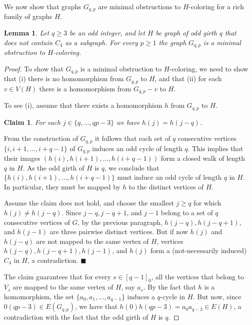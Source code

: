 \documentclass[11pt,a4paper]{article}
\theoremstyle{mystyle}
\newtheorem{lemma}[theorem]{Lemma}
\newtheorem{claim}{Claim}[theorem]
\newenvironment{claimproof}{\noindent {\emph{Proof of Claim.}}}{\hfill$\blacksquare$\medskip}
\begin{document}
We now show that graphs $G_{q,p}$ are minimal obstructions to $H$-coloring for a rich family of graphs $H$.

\begin{lemma}\label{lem:infinite-obstruction}
Let $q \geq 3$ be an odd integer, and let $H$ be graph of odd girth $q$ that does not contain $C_4$ as a subgraph.
For every $p \geq 1$ the graph $G_{q,p}$ is a minimal obstruction to $H$-coloring.
\end{lemma}
\begin{proof}
    To show that $G_{q,p}$ is a minimal obstruction to $H$-coloring, we need to show that
    (i) there is no homomorphism from $G_{q,p}$ to $H$,
    and that (ii) for each $v \in V(H)$ there is a homomorphism from $G_{q,p} - v$ to $H$.

    To see (i), assume that there exists a homomorphism $h$ from $G_{q,p}$ to $H$.
    \begin{claim}
        For each $j \in \{q, \ldots,qp-3\}$ we have $h(j)=h(j-q)$.
    \end{claim}
    \begin{claimproof}
   From the construction of $G_{q,p}$ it follows that each set of $q$ consecutive vertices $\{i,i+1,\ldots,i+q-1\}$ of $G_{q,p}$ induces an odd cycle of length $q$.
   This implies that their images $(h(i),h(i+1),\ldots,h(i+q-1))$ form a closed walk of length $q$ in $H$.
   As the odd girth of $H$ is $q$, we conclude that $\{h(i),h(i+1),\ldots,h(i+q-1)\}$ must induce an odd cycle of length $q$ in $H$.
   In particular, they must be mapped by $h$ to the distinct vertices of $H$.
   
    Assume the claim does not hold, and choose the smallest $j \geq q$ for which $h(j)\neq h(j-q)$.     
    Since $j-q,j-q+1$, and $j-1$ belong to a set of $q$ consecutive vertices of $G$, by the previous paragraph, $h(j-q),h(j-q+1)$, and $h(j-1)$ are three pairwise distinct vertices.
    But if now $h(j)$ and $h(j-q)$ are not mapped to the same vertex of $H$, vertices $h(j-q),h(j-q+1),h(j-1)$, and $h(j)$ form a (not-necessarily induced) $C_4$ in $H$, a contradiction. 
    \end{claimproof}
    
    The claim guarantees that for every $s \in[q-1]_0$, all the vertices that belong to $V_s$ are mapped to the same vertex of $H$, say $a_s$. By the fact that $h$ is a homomorphism, the set $\{a_0,a_1,\ldots,a_{q-1}\}$ induces a $q$-cycle in $H$.
    But now, since $0(qp-3) \in E(G_{q,p})$, we have that $h(0)h(qp-3)=a_0a_{q-3} \in E(H)$, a contradiction with the fact that the odd girth of $H$ is $q$.


\end{proof}
\end{document}
